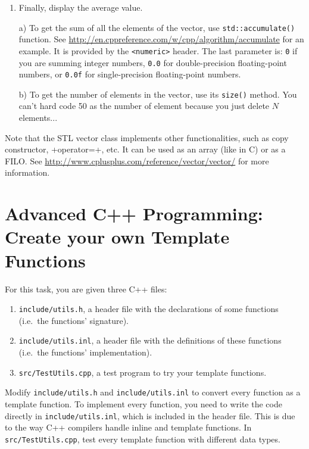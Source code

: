 \begin{enumerate}
\item Finally, display the average value. 

a) To get the sum of all the elements of the vector, use \verb+std::accumulate()+ function. 
See \url{http://en.cppreference.com/w/cpp/algorithm/accumulate} for an example. 
It is provided by the \verb+<numeric>+ header. 
The last parameter is:
\verb+0+ if you are summing integer numbers,
\verb+0.0+ for double-precision floating-point numbers, or 
\verb+0.0f+ for single-precision floating-point numbers.

b) To get the number of elements in the vector, use its \verb+size()+ method. You can't hard code 50 as the number of element because you just delete $N$ elements...
\end{enumerate}

Note that the STL vector class implements other functionalities, such as copy constructor, \vector+operator=+, etc. It can be used as an array (like in C) or as a FILO. See \url{http://www.cplusplus.com/reference/vector/vector/} for more information.


\section{Advanced C++ Programming: Create your own Template Functions}

For this task, you are given three C++ files:
\begin{enumerate}
  \item \verb+include/utils.h+, a header file with the declarations of some functions (i.e.~the functions' signature).
  \item \verb+include/utils.inl+, a header file with the definitions of these functions (i.e.~the functions' implementation).
  \item \verb+src/TestUtils.cpp+, a test program to try your template functions.
\end{enumerate}

Modify \verb+include/utils.h+ and \verb+include/utils.inl+ to convert every function as a template function. 
To implement every function, you need to write the code directly in \verb+include/utils.inl+, which is included in the header file. 
This is due to the way C++ compilers handle inline and template functions. 
In \verb+src/TestUtils.cpp+, test every template function with different data types.


